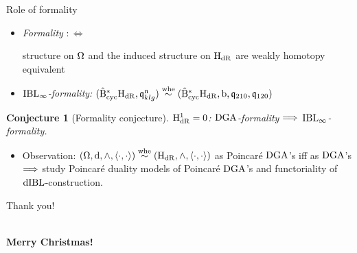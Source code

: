 \documentclass[xcolor=dvipsnames]{beamer}
\theoremstyle{plain}
\newtheorem{conjecture}{Conjecture} %
\renewcommand{\emph}[1]{{\itshape\color{pink}#1}}
\newcommand{\emphbf}[1]{{\bfseries\color{YellowGreen}#1}}
\begin{document}
\begin{frame}{Role of formality}
\begin{itemize}
\item \emph{Formality} $:\Longleftrightarrow$ \parbox[t]{7cm}{structure on $\Omega$ and the induced structure on $\mathrm{H}_{\mathrm{dR}}$ are weakly homotopy equivalent}\pause
\item \emph{$\mathrm{IBL}_\infty$-formality:} $(\hat{\mathrm{B}}_{\mathrm{cyc}}^* \mathrm{H}_{\mathrm{dR}}, \mathfrak{q}_{klg}^{\mathfrak{n}}) \overset{\text{whe}}{\sim} (\hat{\mathrm{B}}_{\mathrm{cyc}}^*\mathrm{H}_{\mathrm{dR}},\mathrm{b},\mathfrak{q}_{210},\mathfrak{q}_{120})$
\end{itemize}\pause
\vspace{.3cm}
\begin{conjecture}[Formality conjecture]
$\mathrm{H}_{\mathrm{dR}}^1 = 0$: $\mathrm{DGA}$-formality $\Longrightarrow$ $\mathrm{IBL}_\infty$-formality.
\end{conjecture}
\begin{itemize}\pause
\vspace{.3cm}
\item Observation: $(\Omega,\mathrm{d},\wedge,\langle\cdot,\cdot\rangle) \overset{\text{whe}}{\sim} (\mathrm{H}_{\mathrm{dR}},\wedge,\langle\cdot,\cdot\rangle)$ as Poincar\'e $\mathrm{DGA}$'s iff as $\mathrm{DGA}$'s $\Longrightarrow$ study Poincar\'e duality models of Poincar\'e $\mathrm{DGA}$'s and functoriality of $\mathrm{dIBL}$-construction.
\end{itemize}
\end{frame}


\begin{frame}[fragile]{Thank you!}
\begin{center}
\def\baselist{{0,1.8,3.2}}
\def\hghtlist{{1.8,1.5,1}}
\def\wghtlist{{6,4,2}}
\def\trnkwght{.5}
\def\trnkhght{1.2}
\\
\Huge \emphbf{Merry Christmas!}
\end{center}
\end{frame}
\end{document}
